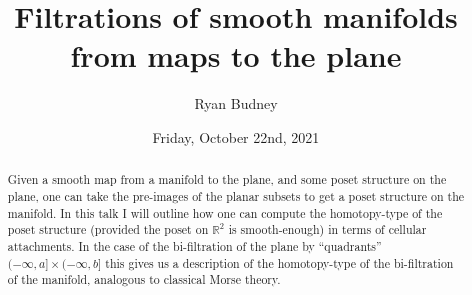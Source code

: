 \documentclass{UAmathtalk}
\author{Ryan Budney}
\title{Filtrations of smooth manifolds from maps to the plane}
\date{Friday, October 22nd, 2021}
\begin{document}
\maketitle

%

\begin{abstract}
Given a smooth map from a manifold to the plane, and some poset structure on the plane, one can take the pre-images of the planar subsets to get a poset structure on the manifold.  In this talk I will outline how one can compute the homotopy-type of the poset structure (provided the poset on $\mathbb{R}^2$ is smooth-enough) in terms of cellular attachments.  In the case of the bi-filtration of the plane by ``quadrants'' $(-\infty,a] \times (-\infty,b]$ this gives us a description of the homotopy-type of the bi-filtration of the manifold, analogous to classical Morse theory. 
\end{abstract}
\end{document}
